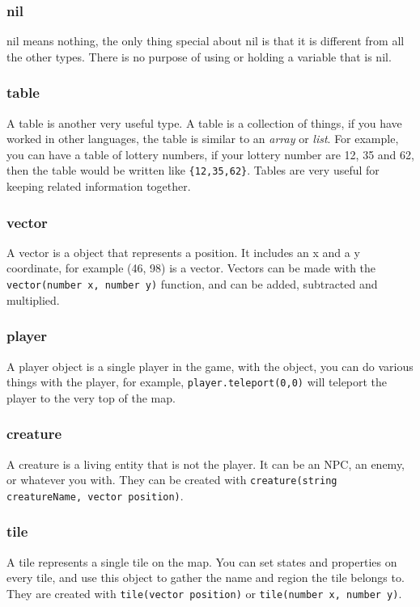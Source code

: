 \documentclass{book}
\begin{document}
\subsubsection{nil}
nil means nothing, the only thing special about nil is that it is different from all the other types. There is no purpose of using or holding a variable that is nil.

\subsubsection{table}
A table is another very useful type. A table is a collection of things, if you have worked in other languages, the table is similar to an \textit{array} or \textit{list}. For example, you can have a table of lottery numbers, if your lottery number are 12, 35 and 62, then the table would be written like \texttt{\{12,35,62\}}. Tables are very useful for keeping related information together.

\subsubsection{vector}
A vector is a object that represents a position. It includes an x and a y coordinate, for example (46, 98) is a vector. Vectors can be made with the \texttt{vector(number x, number y)} function, and can be added, subtracted and multiplied.

\subsubsection{player}
A player object is a single player in the game, with the object, you can do various things with the player, for example, \texttt{player.teleport(0,0)} will teleport the player to the very top of  the map.

\subsubsection{creature}
A creature is a living entity that is not the player. It can be an NPC, an enemy, or whatever you with. They can be created with \texttt{creature(string creatureName, vector position)}.

\subsubsection{tile}
A tile represents a single tile on the map. You can set states and properties on every tile, and use this object to gather the name and region the tile belongs to. They are created with \texttt{tile(vector position)} or \texttt{tile(number x, number y)}.
\end{document}
